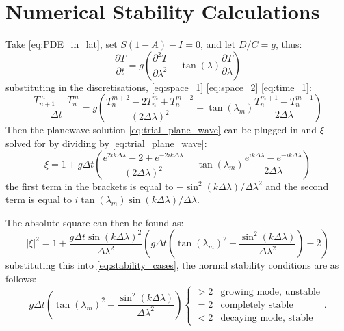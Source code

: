 \documentclass[12pt, onecolumn]{revtex4-2}    %
\begin{document}
\clearpage

\appendix

\section{Numerical Stability Calculations} \label{app:numstabworkings}

Take \eqref{eq:PDE_in_lat}, set $S(1-A) - I = 0$,
and let $D / C = g$, thus:
\begin{equation*}
    \frac{\partial T}{\partial t} = g \left(\frac{\partial^2 T}{\partial \lambda^2} - \tan(\lambda)\frac{\partial T}{\partial \lambda}\right)
\end{equation*}
substituting in the discretisations, \eqref{eq:space_1} \eqref{eq:space_2} \eqref{eq:time_1}:
\begin{equation*}
    \frac{T^m_{n+1}-T^m_n}{\Delta t} = g \left(\frac{T^{m+2}_{n} - 2T^{m}_{n} + T^{m-2}_{n}}{(2\Delta \lambda)^2} - \tan(\lambda_m)\frac{T^{m+1}_{n} - T^{m-1}_{n}}{2 \Delta \lambda}\right)
\end{equation*}
Then the planewave solution \eqref{eq:trial_plane_wave} can be plugged in and $\xi$ solved for by dividing by \eqref{eq:trial_plane_wave}:
\begin{equation*}
    \xi = 1 + g \Delta t \left( \frac{e^{2ik\Delta\lambda} - 2 + e^{-2ik\Delta\lambda}}{(2\Delta\lambda)^2} - \tan(\lambda_m) \frac{e^{ik\Delta\lambda} - e^{-ik\Delta\lambda}}{2\Delta\lambda} \right)
\end{equation*}
the first term in the brackets is equal to $-\sin^2(k\Delta\lambda) / \Delta\lambda^2$ and the second term is equal to $i\tan(\lambda_m)\sin(k\Delta\lambda) / \Delta\lambda$.

The absolute square can then be found as:
\begin{equation*}
    |\xi|^2 = 1 + \frac{g \Delta t \sin(k\Delta\lambda)^2}{\Delta \lambda^2}\left(g\Delta t\left(\tan(\lambda_m)^2 + \frac{\sin^2(k\Delta\lambda)}{\Delta\lambda^2}\right) - 2 \right)
\end{equation*}
substituting this into \eqref{eq:stability_cases}, the normal stability conditions are as follows:
\begin{equation}\label{appeq:normalstability}
    g\Delta t\left(\tan(\lambda_m)^2 + \frac{\sin^2(k\Delta\lambda)}{\Delta\lambda^2}\right)
    \begin{cases}
        > 2 & \text{growing mode, unstable} \\
        = 2 & \text{completely stable}      \\
        < 2 & \text{decaying mode, stable}
    \end{cases}
    .
\end{equation}
\end{document}
